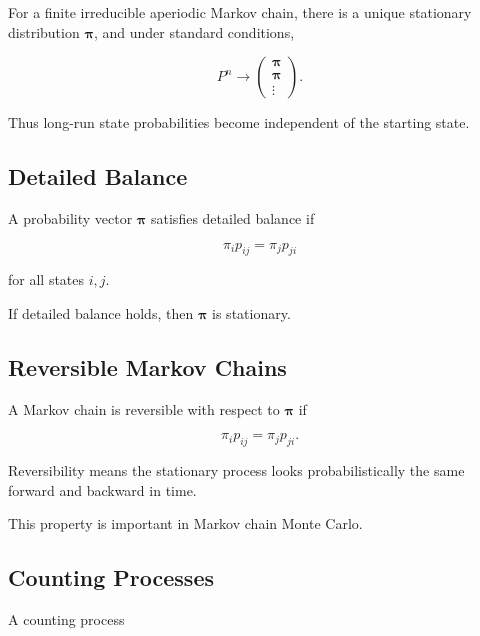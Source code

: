 For a finite irreducible aperiodic Markov chain, there is a unique
stationary distribution \(\boldsymbol{\pi}\), and under standard
conditions,

\[
\boxed{
P^n
\to
\begin{pmatrix}
\boldsymbol{\pi}\\
\boldsymbol{\pi}\\
\vdots
\end{pmatrix}.
}
\]

Thus long-run state probabilities become independent of the starting
state.

\subsection{Detailed Balance}
\label{subsec:detailed-balance}

A probability vector \(\boldsymbol{\pi}\) satisfies detailed balance if

\[
\boxed{
\pi_ip_{ij}
=
\pi_jp_{ji}
}
\]

for all states \(i,j\).

If detailed balance holds, then \(\boldsymbol{\pi}\) is stationary.

\subsection{Reversible Markov Chains}
\label{subsec:reversible-markov-chains}

A Markov chain is reversible with respect to \(\boldsymbol{\pi}\) if

\[
\boxed{
\pi_ip_{ij}
=
\pi_jp_{ji}.
}
\]

Reversibility means the stationary process looks probabilistically the
same forward and backward in time.

This property is important in Markov chain Monte Carlo.

\subsection{Counting Processes}
\label{subsec:counting-processes}

A counting process

